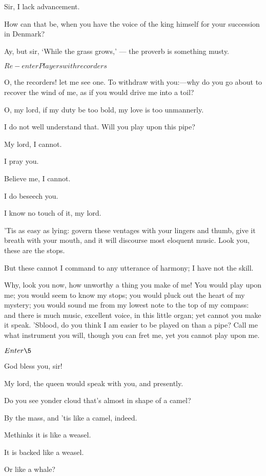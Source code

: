 \documentclass[11pt]{book}
\begin{document}
\1	Sir, I lack advancement.

	How can that be, when you have the voice of the king
	himself for your succession in Denmark?

\1	Ay, but sir, `While the grass grows,' --- the proverb
	is something musty.

	\(Re-enter Players with recorders\)

	O, the recorders! let me see one. To withdraw with
	you:---why do you go about to recover the wind of me,
	as if you would drive me into a toil?

	O, my lord, if my duty be too bold, my love is too
	unmannerly.

\1	I do not well understand that. Will you play upon
	this pipe?

	My lord, I cannot.

\1	I pray you.

	Believe me, I cannot.

\1	I do beseech you.

	I know no touch of it, my lord.

\1	'Tis as easy as lying: govern these ventages with
	your lingers and thumb, give it breath with your
	mouth, and it will discourse most eloquent music.
	Look you, these are the stops.

	But these cannot I command to any utterance of
	harmony; I have not the skill.

\1	Why, look you now, how unworthy a thing you make of
	me! You would play upon me; you would seem to know
	my stops; you would pluck out the heart of my
	mystery; you would sound me from my lowest note to
	the top of my compass: and there is much music,
	excellent voice, in this little organ; yet cannot
	you make it speak. 'Sblood, do you think I am
	easier to be played on than a pipe? Call me what
	instrument you will, though you can fret me, yet you
	cannot play upon me.

	\(Enter \5\)

	God bless you, sir!

\5	My lord, the queen would speak with you, and
	presently.

\1	Do you see yonder cloud that's almost in shape of a camel?

\5	By the mass, and 'tis like a camel, indeed.

\1	Methinks it is like a weasel.

\5	It is backed like a weasel.

\1	Or like a whale?
\end{document}
